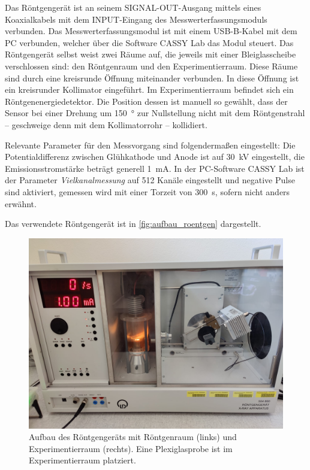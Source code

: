 \documentclass[ngerman]{scrartcl}
\begin{document}
Das Röntgengerät ist an seinem SIGNAL-OUT-Ausgang mittels eines Koaxialkabels mit dem INPUT-Eingang des Messwerterfassungsmoduls verbunden. Das Messwerterfassungsmodul ist mit einem USB-B-Kabel mit dem PC verbunden, welcher über die Software CASSY Lab das Modul steuert. Das Röntgengerät selbst weist zwei Räume auf, die jeweils mit einer Bleiglasscheibe verschlossen sind: den Röntgenraum und den Experimentierraum. Diese Räume sind durch eine kreisrunde Öffnung miteinander verbunden. In diese Öffnung ist ein kreisrunder Kollimator eingeführt. Im Experimentierraum befindet sich ein Röntgenenergiedetektor. Die Position dessen ist manuell so gewählt, dass der Sensor bei einer Drehung um \SI{150}{\degree} zur Nullstellung nicht mit dem Röntgenstrahl -- geschweige denn mit dem Kollimatorrohr -- kollidiert.

Relevante Parameter für den Messvorgang sind folgendermaßen eingestellt: Die Potentialdifferenz zwischen Glühkathode und Anode ist auf \SI{30}{kV} eingestellt, die Emissionsstromstärke beträgt generell \SI{1}{mA}. In der PC-Software CASSY Lab ist der Parameter \textit{Vielkanalmessung} auf 512 Kanäle eingestellt und negative Pulse sind aktiviert, gemessen wird mit einer Torzeit von \SI{300}{s}, sofern nicht anders erwähnt.

Das verwendete Röntgengerät ist in \autoref{fig:aufbau_roentgen} dargestellt.
%
\begin{figure}[H]
    \centering
    \begin{samepage}
        \includegraphics[width=0.75\linewidth]{fig/Uebersicht_acryl.jpeg}
        \caption[Aufbau des Röntgengeräts]{
            Aufbau des Röntgengeräts mit Röntgenraum (links) und Experimentierraum (rechts). Eine Plexiglasprobe ist im Experimentierraum platziert.
        }
        \label{fig:aufbau_roentgen}
    \end{samepage}
\end{figure}
\end{document}
